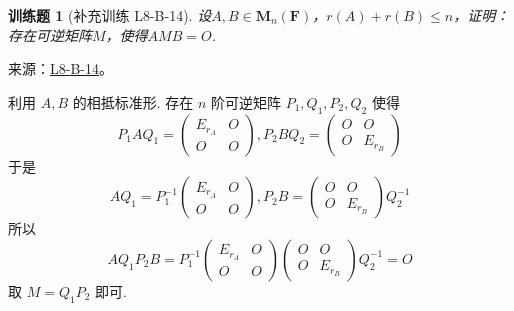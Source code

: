 \documentclass[UTF8,12pt,a4paper,fontset=fandol]{ctexart}
\newtheorem{exercise}{训练题}[section]
\begin{document}
\begin{exercise}[补充训练 L8-B-14]\label{prob:L8-B-14}
设$A,B \in \mathbf{M}_n(\mathbf{F})$，$r(A)+r(B) \leqslant n$，证明：存在可逆矩阵$M$，使得$AMB=O$.
\end{exercise}
\noindent 来源：\href{https://github.com/yhwu-is/Linear-Algebra-Left-Undone/blob/new/%E8%AE%B2%E4%B9%89/%E4%B8%93%E9%A2%98/8%20%E7%9B%B8%E6%8A%B5%E6%A0%87%E5%87%86%E5%BD%A2.tex}{L8-B-14}。
\begin{solve}
利用 $A,B$ 的相抵标准形. 存在 $n$ 阶可逆矩阵 $P_1,Q_1,P_2,Q_2$ 使得
          \[P_1AQ_1=\begin{pmatrix}E_{r_A} & O \\ O & O\end{pmatrix},P_2BQ_2=\begin{pmatrix}O & O \\ O & E_{r_B}\end{pmatrix}\]
          于是 \[AQ_1=P_1^{-1}\begin{pmatrix}E_{r_A} & O \\ O & O\end{pmatrix},P_2B=\begin{pmatrix}O & O \\ O & E_{r_B}\end{pmatrix}Q_2^{-1}\]
          所以 \[AQ_1P_2B=P_1^{-1}\begin{pmatrix}E_{r_A} & O \\ O & O\end{pmatrix}\begin{pmatrix}O & O \\ O & E_{r_B}\end{pmatrix}Q_2^{-1}=O\]
          取 $M=Q_1P_2$ 即可.
\end{solve}
\end{document}
